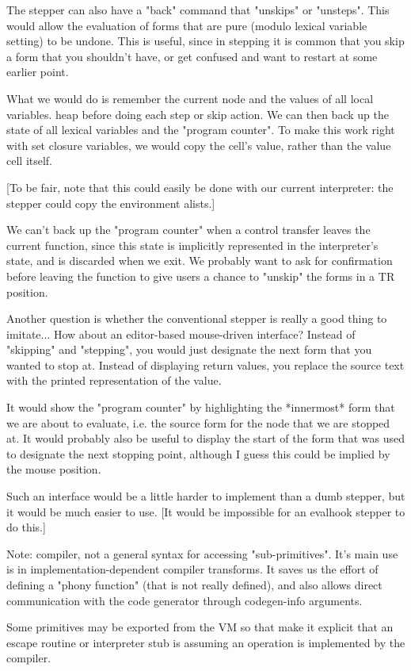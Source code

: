 The stepper can also have a "back" command that "unskips" or "unsteps".  This
would allow the evaluation of forms that are pure (modulo lexical variable
setting) to be undone.  This is useful, since in stepping it is common that you
skip a form that you shouldn't have, or get confused and want to restart at
some earlier point.

What we would do is remember the current node and the values of all local
variables.  heap before doing each step or skip action.  We can then back up
the state of all lexical variables and the "program counter".  To make this
work right with set closure variables, we would copy the cell's value, rather
than the value cell itself.

[To be fair, note that this could easily be done with our current interpreter:
the stepper could copy the environment alists.]

We can't back up the "program counter" when a control transfer leaves the
current function, since this state is implicitly represented in the
interpreter's state, and is discarded when we exit.  We probably want to ask
for confirmation before leaving the function to give users a chance to "unskip"
the forms in a TR position.

Another question is whether the conventional stepper is really a good thing to
imitate...  How about an editor-based mouse-driven interface?  Instead of
"skipping" and "stepping", you would just designate the next form that you
wanted to stop at.  Instead of displaying return values, you replace the source
text with the printed representation of the value.

It would show the "program counter" by highlighting the *innermost* form that
we are about to evaluate, i.e. the source form for the node that we are stopped
at.  It would probably also be useful to display the start of the form that was
used to designate the next stopping point, although I guess this could be
implied by the mouse position.


Such an interface would be a little harder to implement than a dumb stepper,
but it would be much easier to use.  [It would be impossible for an evalhook
stepper to do this.]



Note: %
compiler, not a general syntax for accessing "sub-primitives".  It's main use
is in implementation-dependent compiler transforms.  It saves us the effort of
defining a "phony function" (that is not really defined), and also allows
direct communication with the code generator through codegen-info arguments.

Some primitives may be exported from the VM so that %
make it explicit that an escape routine or interpreter stub is assuming an
operation is implemented by the compiler.
